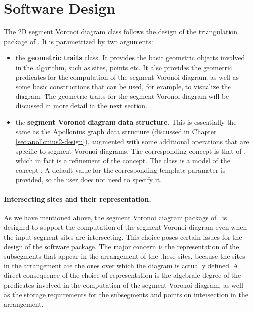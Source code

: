 \section{Software Design}
\label{sec:segvor2-design}

The 2D segment Voronoi diagram class
follows the design of the triangulation package of \cgal. It is
parametrized by two arguments:
\begin{itemize}
\item the {\bf geometric traits} class. It provides the basic
  geometric objects involved in the algorithm, such as sites, points
  etc. It also provides the geometric predicates for the computation
  of the segment Voronoi diagram, as well as some basic constructions
  that can be used, for example, to visualize the diagram.
  The geometric traits for the segment Voronoi diagram will be
  discussed in more detail in the next section.
\item the {\bf segment Voronoi diagram data structure}. This is
  essentially the same as the Apollonius graph data structure (discussed
  in Chapter \ref{sec:apollonius2-design}), augmented with some
  additional operations that are specific to segment Voronoi
  diagrams. The corresponding concept is that of
  , which in fact is a refinement
  of the  concept. The class
   is a model of
  the concept . A default value
  for the corresponding template parameter is provided, so the user
  does not need to specify it.
\end{itemize}


\paragraph{Intersecting sites and their representation.}
As we have mentioned above, the segment Voronoi diagram package of
\cgal\ is designed to support the computation of the segment Voronoi
diagram even when the input segment sites are intersecting. This
choice poses certain issues for the design of the software
package. The major concern is the representation of the subsegments
that appear in the arrangement of the these sites, because the sites
in the arrangement are the ones over which the diagram is actually
defined. A direct consequence of the choice of representation is the
algebraic degree of the predicates involved in the computation of the
segment Voronoi diagram, as well as the storage requirements for the
subsegments and points on intersection in the arrangement.

